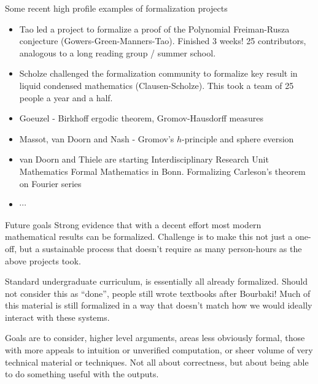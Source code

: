 \documentclass{beamer}
\theoremstyle{plain}
\begin{document}
\begin{frame}{Some recent high profile examples of formalization projects}
    \begin{itemize}
        \item Tao led a project to formalize a proof of  the Polynomial Freiman-Rusza conjecture (Gowers-Green-Manners-Tao).
            Finished 3 weeks! 25 contributors, analogous to a long reading group / summer school.
        \item Scholze challenged the formalization community to formalize 
            key result in liquid condensed mathematics (Clausen-Scholze). This took a team of 25 people a year and a half.
        \item Goeuzel - Birkhoff ergodic theorem, Gromov-Hausdorff measures
        \item Massot, van Doorn and Nash - Gromov's $h$-principle and sphere eversion
        \item van Doorn and Thiele are starting Interdisciplinary Research Unit Mathematics Formal Mathematics in Bonn.
        Formalizing Carleson's theorem on Fourier series
        \item $\cdots$
    \end{itemize}

\end{frame}


\begin{frame}{Future goals}
    Strong evidence that with a decent effort most modern mathematical results can be formalized.
    Challenge is to make this not just a one-off, but a sustainable process that doesn't require as many person-hours as the above projects took.

    Standard undergraduate curriculum, is essentially all already formalized.
    Should not consider this as ``done'', people still wrote textbooks after Bourbaki!
    Much of this material is still formalized in a way that doesn't match how we would ideally interact with these systems.

    Goals are to consider, higher level arguments, areas less obviously formal, those with more appeals to intuition or unverified computation, or sheer volume of very technical material or techniques.
    Not all about correctness, but about being able to do something useful with the outputs.
\end{frame}
\end{document}
